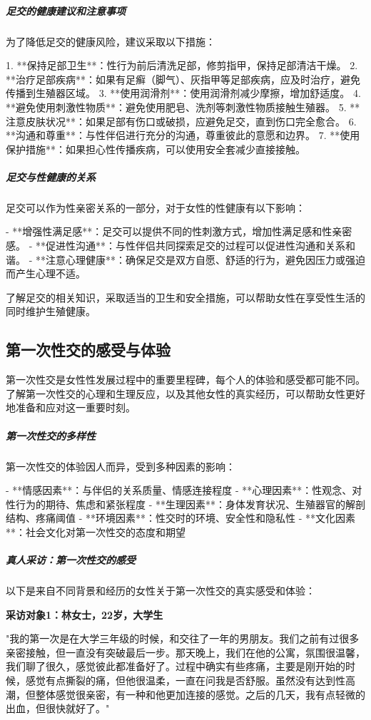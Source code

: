 \begin{enumerate}
\subparagraph{足交的健康建议和注意事项}

为了降低足交的健康风险，建议采取以下措施：

1. **保持足部卫生**：性行为前后清洗足部，修剪指甲，保持足部清洁干燥。
2. **治疗足部疾病**：如果有足癣（脚气）、灰指甲等足部疾病，应及时治疗，避免传播到生殖器区域。
3. **使用润滑剂**：使用润滑剂减少摩擦，增加舒适度。
4. **避免使用刺激性物质**：避免使用肥皂、洗剂等刺激性物质接触生殖器。
5. **注意皮肤状况**：如果足部有伤口或破损，应避免足交，直到伤口完全愈合。
6. **沟通和尊重**：与性伴侣进行充分的沟通，尊重彼此的意愿和边界。
7. **使用保护措施**：如果担心性传播疾病，可以使用安全套减少直接接触。

\subparagraph{足交与性健康的关系}

足交可以作为性亲密关系的一部分，对于女性的性健康有以下影响：

- **增强性满足感**：足交可以提供不同的性刺激方式，增加性满足感和性亲密感。
- **促进性沟通**：与性伴侣共同探索足交的过程可以促进性沟通和关系和谐。
- **注意心理健康**：确保足交是双方自愿、舒适的行为，避免因压力或强迫而产生心理不适。

了解足交的相关知识，采取适当的卫生和安全措施，可以帮助女性在享受性生活的同时维护生殖健康。

\subsection{第一次性交的感受与体验}

第一次性交是女性性发展过程中的重要里程碑，每个人的体验和感受都可能不同。了解第一次性交的心理和生理反应，以及其他女性的真实经历，可以帮助女性更好地准备和应对这一重要时刻。

\subparagraph{第一次性交的多样性}

第一次性交的体验因人而异，受到多种因素的影响：

- **情感因素**：与伴侣的关系质量、情感连接程度
- **心理因素**：性观念、对性行为的期待、焦虑和紧张程度
- **生理因素**：身体发育状况、生殖器官的解剖结构、疼痛阈值
- **环境因素**：性交时的环境、安全性和隐私性
- **文化因素**：社会文化对第一次性交的态度和期望

\subparagraph{真人采访：第一次性交的感受}

以下是来自不同背景和经历的女性关于第一次性交的真实感受和体验：

\textbf{采访对象1：林女士，22岁，大学生}

"我的第一次是在大学三年级的时候，和交往了一年的男朋友。我们之前有过很多亲密接触，但一直没有突破最后一步。那天晚上，我们在他的公寓，氛围很温馨，我们聊了很久，感觉彼此都准备好了。过程中确实有些疼痛，主要是刚开始的时候，感觉有点撕裂的痛，但他很温柔，一直在问我是否舒服。虽然没有达到性高潮，但整体感觉很亲密，有一种和他更加连接的感觉。之后的几天，我有点轻微的出血，但很快就好了。" 


\end{enumerate}
